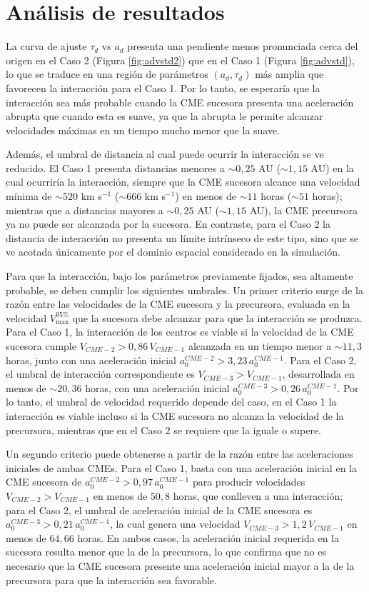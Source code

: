 \chapter{Análisis de resultados}

La curva de ajuste $\tau_d$ vs $a_d$ presenta una pendiente menos pronunciada cerca del origen en el Caso 2 (Figura \ref{fig:advstd2}) que en el Caso 1 (Figura \ref{fig:advstd}), lo que se traduce en una región de parámetros $(a_d,\tau_d)$ más amplia que favorecen la interacción para el Caso 1. Por lo tanto, se esperaría que la interacción sea más probable cuando la CME sucesora presenta una aceleración abrupta que cuando esta es suave, ya que la abrupta le permite alcanzar velocidades máximas en un tiempo mucho menor que la suave.

Además, el umbral de distancia al cual puede ocurrir la interacción se ve reducido. El Caso 1 presenta distancias menores a $\sim0{,}25$ AU ($\sim1{,}15$ AU) en la cual ocurriría la interacción, siempre que la CME sucesora alcance una velocidad mínima de $\sim520$ km s$^{-1}$ ($\sim666$ km s$^{-1}$) en menos de $\sim11$ horas ($\sim51$ horas); mientras que a distancias mayores a $\sim0{,}25$ AU ($\sim1{,}15$ AU), la CME precursora ya no puede ser alcanzada por la sucesora. En contraste, para el Caso 2 la distancia de interacción no presenta un límite intrínseco de este tipo, sino que se ve acotada únicamente por el dominio espacial considerado en la simulación.

Para que la interacción, bajo los parámetros previamente fijados, sea altamente probable, se deben cumplir los siguientes umbrales. Un primer criterio surge de la razón entre las velocidades de la CME sucesora y la precursora, evaluada en la velocidad $V_\text{max}^{95\%}$ que la sucesora debe alcanzar para que la interacción se produzca. Para el Caso 1, la interacción de los centros es viable si la velocidad de la CME sucesora cumple $V_{CME-2}>0{,}86\,V_{CME-1}$ alcanzada en un tiempo menor a $\sim11{,}3$ horas, junto con una aceleración inicial $a_0^{CME-2}>3{,}23\,a_0^{CME-1}$. Para el Caso 2, el umbral de interacción correspondiente es $V_{CME-3}>V_{CME-1}$, desarrollada en menos de $\sim20{,}36$ horas, con una aceleración inicial $a_0^{CME-3}>0{,}26\,a_0^{CME-1}$. Por lo tanto, el umbral de velocidad requerido depende del caso, en el Caso 1 la interacción es viable incluso si la CME sucesora no alcanza la velocidad de la precursora, mientras que en el Caso 2 se requiere que la iguale o supere.

Un segundo criterio puede obtenerse a partir de la razón entre las aceleraciones iniciales de ambas CMEs. Para el Caso 1, basta con una aceleración inicial en la CME sucesora de $a_0^{CME-2}>0{,}97\,a_0^{CME-1}$ para producir velocidades $V_{CME-2}>V_{CME-1}$ en menos de $50{,}8$ horas, que conlleven a una interacción; para el Caso 2, el umbral de aceleración inicial de la CME sucesora es $a_0^{CME-3}>0{,}21\,a_0^{CME-1}$, la cual genera una velocidad $V_{CME-3}>1{,}2\,V_{CME-1}$ en menos de $64{,}66$ horas. En ambos casos, la aceleración inicial requerida en la sucesora resulta menor que la de la precursora, lo que confirma que no es necesario que la CME sucesora presente una aceleración inicial mayor a la de la precursora para que la interacción sea favorable.

